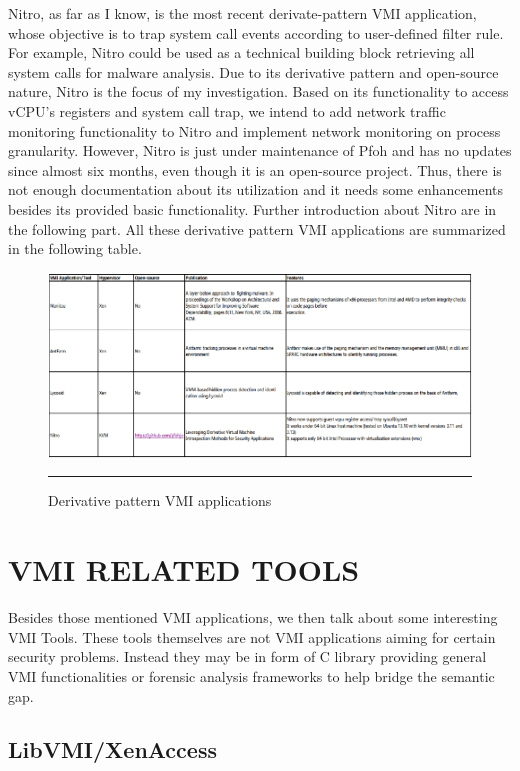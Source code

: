 Nitro, as far as I know, is the most recent derivate-pattern VMI application, whose objective is to trap system call events according to user-defined filter rule. For example, Nitro could be used as a technical building block retrieving all system calls for malware analysis. Due to its derivative pattern and open-source nature, Nitro is the focus of my investigation. Based on its functionality to access vCPU’s registers and system call trap, we intend to add network traffic monitoring functionality to Nitro and implement network monitoring on process granularity. However, Nitro is just under maintenance of Pfoh and has no updates since almost six months, even though it is an open-source project. Thus, there is not enough documentation about its utilization and it needs some enhancements besides its provided basic functionality. Further introduction about Nitro are in the following part. All these derivative pattern VMI applications are summarized in the following table.

\begin{figure}[htbp]
	\centering
		\includegraphics{Figures/Figure2.pdf}
		\rule{35em}{0.5pt}
	\caption[Derivative pattern VMI applications]{Derivative pattern VMI applications}
	\label{fig:Derivative pattern VMI applications}
\end{figure}



\section{VMI RELATED TOOLS}

Besides those mentioned VMI applications, we then talk about some interesting VMI Tools. These tools themselves are not VMI applications aiming for certain security problems. Instead they may be in form of C library providing general VMI functionalities or forensic analysis frameworks to help bridge the semantic gap.


\subsection{LibVMI/XenAccess  \citep{Reference10,Reference11}}

